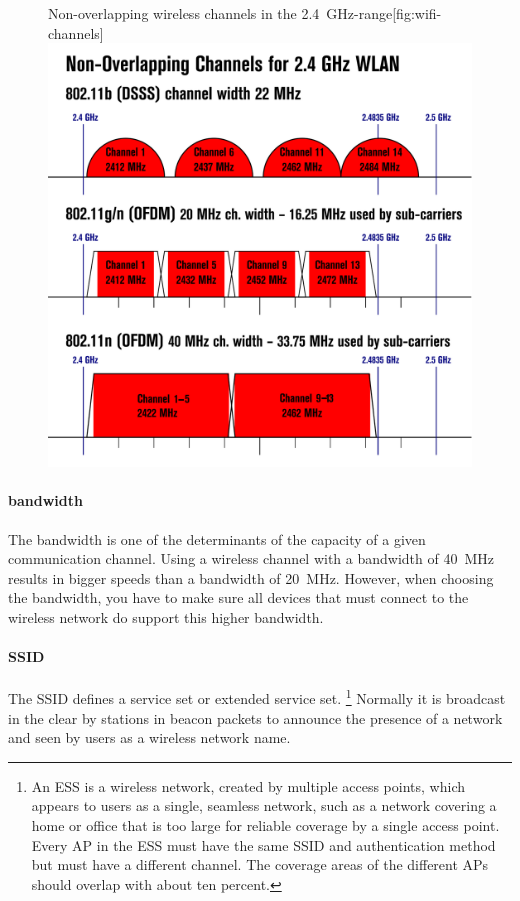 \begin{figure}
\begin{sidecaption}{Non-overlapping wireless channels in the \SI{2.4}{\giga\hertz}-range}[fig:wifi-channels]
\centering
\includegraphics[width=\textwidth]{images/physical/wifi-channels.png}
\end{sidecaption}
\end{figure}

\paragraph{bandwidth}
The bandwidth is one of the determinants of the capacity of a given communication channel.
Using a wireless channel with a bandwidth of \SI{40}{\mega\hertz} results in bigger speeds than a bandwidth of \SI{20}{\mega\hertz}.
However, when choosing the bandwidth, you have to make sure all devices that must connect to the wireless network do support this higher bandwidth.

\paragraph{SSID}
The \ac{SSID} defines a service set or extended service set.%
\footnote{%
   An \ac{ESS} is a wireless network, created by multiple access points, which appears to users as a single, seamless network, such as a network covering a home or office that is too large for reliable coverage by a single access point.
   Every \acf{AP} in the \acs{ESS} must have the same \acs{SSID} and authentication method but must have a different channel.
   The coverage areas of the different \aclp{AP} should overlap with about ten percent.
   }
Normally it is broadcast in the clear by stations in beacon packets to announce the presence of a network and seen by users as a wireless network name.

